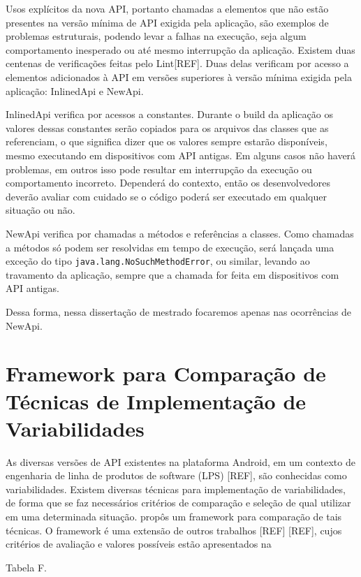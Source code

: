 Usos explícitos da nova API, portanto chamadas a elementos que não estão presentes
na versão mínima de API exigida pela aplicação, são exemplos de problemas estruturais,
podendo levar a falhas na execução, seja algum comportamento inesperado ou até
mesmo interrupção da aplicação. Existem duas centenas de verificações feitas pelo
Lint[REF]. Duas delas verificam por acesso a elementos
adicionados à API em versões superiores à versão mínima exigida pela aplicação: 
InlinedApi e NewApi.

InlinedApi verifica por acessos a constantes. Durante o build da aplicação os
valores dessas constantes serão copiados para os arquivos das classes que as
referenciam, o que significa dizer que os valores sempre estarão disponíveis,
mesmo executando em dispositivos com API antigas. Em alguns casos não haverá
problemas, em outros isso pode resultar em interrupção da execução ou comportamento
incorreto. Dependerá do contexto, então os desenvolvedores deverão avaliar com
cuidado se o código poderá ser executado em qualquer situação ou não.

NewApi verifica por chamadas a métodos e referências a classes. Como chamadas a
métodos só podem ser resolvidas em tempo de execução, será lançada uma exceção do
tipo \texttt{java.lang.NoSuchMethodError}, ou similar, levando ao travamento da
aplicação, sempre que a chamada for feita em dispositivos com API antigas.

Dessa forma, nessa dissertação de mestrado focaremos apenas nas ocorrências de NewApi.


\section{Framework para Comparação de Técnicas de Implementação de Variabilidades} \label{sec:framework}

As diversas versões de API existentes na plataforma Android, em um contexto de
engenharia de linha de produtos de software (LPS) [REF],
são conhecidas como variabilidades. Existem diversas técnicas para implementação
de variabilidades, de forma que se faz necessários critérios de comparação e
seleção de qual utilizar em uma determinada situação. propôs um framework para
comparação de tais técnicas. O framework é uma extensão de outros trabalhos [REF] [REF],
cujos critérios de avaliação e valores possíveis estão apresentados na 

Tabela F.

